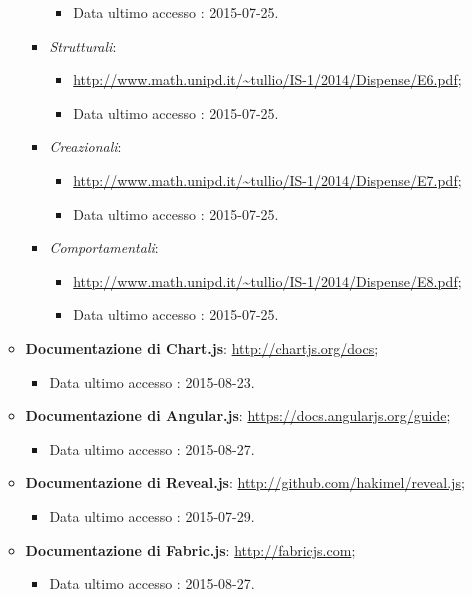 \begin{itemize}
\begin{itemize}
\begin{itemize}
\begin{itemize}
									\item Data ultimo accesso : 2015-07-25.						
							\end{itemize}
						\item \textit{Strutturali}:
						\begin{itemize}
						\item \url{http://www.math.unipd.it/~tullio/IS-1/2014/Dispense/E6.pdf};
							\item Data ultimo accesso : 2015-07-25.						
						\end{itemize}
						\item \textit{Creazionali}:
						\begin{itemize}
						\item \url{http://www.math.unipd.it/~tullio/IS-1/2014/Dispense/E7.pdf};
							\item Data ultimo accesso : 2015-07-25.						
						\end{itemize}
						\item \textit{Comportamentali}:
						\begin{itemize}
						\item \url{http://www.math.unipd.it/~tullio/IS-1/2014/Dispense/E8.pdf};
							\item Data ultimo accesso : 2015-07-25.						
						\end{itemize}
					\end{itemize}
					\item \textbf{Documentazione di Chart.js}: \url{http://chartjs.org/docs};
					\begin{itemize}
						\item Data ultimo accesso : 2015-08-23.						
					\end{itemize}

					\item \textbf{Documentazione di Angular.js}: \url{https://docs.angularjs.org/guide};
					\begin{itemize}
						\item Data ultimo accesso : 2015-08-27.						
					\end{itemize}
					
					\item \textbf{Documentazione di Reveal.js}: \url{http://github.com/hakimel/reveal.js};
					\begin{itemize}
						\item Data ultimo accesso : 2015-07-29.						
					\end{itemize}
					
					\item \textbf{Documentazione di Fabric.js}: \url{http://fabricjs.com};
					\begin{itemize}
						\item Data ultimo accesso : 2015-08-27.						
					\end{itemize}
					

\end{itemize}
\end{itemize}
